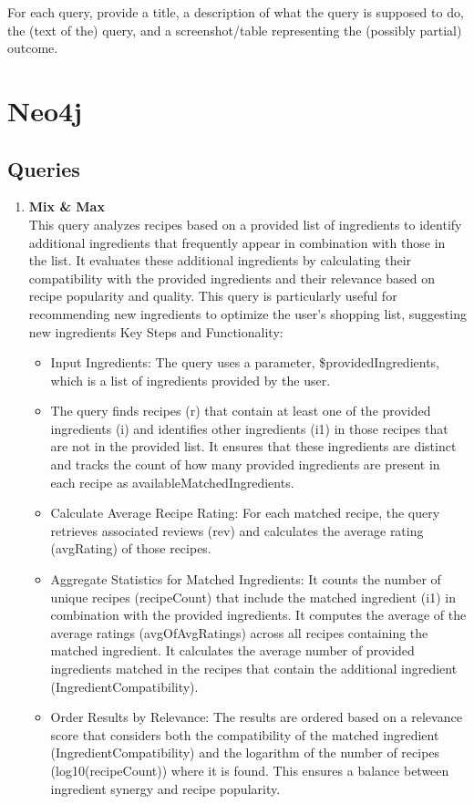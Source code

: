 For each query, provide a title, a description of what the query is supposed to
do, the (text of the) query, and a screenshot/table representing the (possibly
partial) outcome.

\section{Neo4j}

\subsection{Queries}
\begin{enumerate}
    \item \textbf{Mix \& Max}\\
This query analyzes recipes based on a provided list of ingredients to identify additional ingredients that frequently appear in combination with those in the list. It evaluates these additional ingredients by calculating their compatibility with the provided ingredients and their relevance based on recipe popularity and quality.
This query is particularly useful for recommending new ingredients to optimize the user's shopping list, suggesting new ingredients 
Key Steps and Functionality:
\begin{itemize}
    \item Input Ingredients:
The query uses a parameter, \$providedIngredients, which is a list of ingredients provided by the user.
    \item The query finds recipes (r) that contain at least one of the provided ingredients (i) and identifies other ingredients (i1) in those recipes that are not in the provided list. It ensures that these ingredients are distinct and tracks the count of how many provided ingredients are present in each recipe as availableMatchedIngredients.
    \item Calculate Average Recipe Rating:
For each matched recipe, the query retrieves associated reviews (rev) and calculates the average rating (avgRating) of those recipes.
    \item Aggregate Statistics for Matched Ingredients:
It counts the number of unique recipes (recipeCount) that include the matched ingredient (i1) in combination with the provided ingredients.
It computes the average of the average ratings (avgOfAvgRatings) across all recipes containing the matched ingredient.
It calculates the average number of provided ingredients matched in the recipes that contain the additional ingredient (IngredientCompatibility).
    \item Order Results by Relevance:
The results are ordered based on a relevance score that considers both the compatibility of the matched ingredient (IngredientCompatibility) and the logarithm of the number of recipes (log10(recipeCount)) where it is found. This ensures a balance between ingredient synergy and recipe popularity.
\end{itemize}


\end{enumerate}
